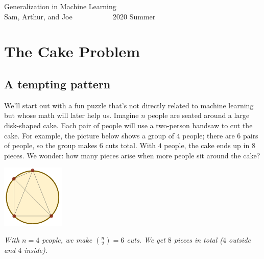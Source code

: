 \documentclass[openany, notitlepage, justified]{tufte-book}
\begin{document}
    \begin{adjustwidth}{0in}{-1.3in}
    \begin{center}
        \Huge 
        Generalization in Machine Learning \\
        \large         
        Sam, Arthur, and Joe ~~~~~~~~~~ 2020 Summer
    \end{center}
    \end{adjustwidth}

    \chapter{The Cake Problem}
        \section{A tempting pattern}
            We'll start out with a fun puzzle that's not directly related to
            machine learning but whose math will later help us.
            Imagine $n$ people are seated around a large disk-shaped cake.
            Each pair of people will use a two-person handsaw to cut the cake.
            For example, the picture below shows a group of $4$ people; there
            are $6$ pairs of people, so the group makes $6$ cuts total.  With
            $4$ people, the cake ends up in $8$ pieces.  We
            wonder: how many pieces arise when more people sit
            around the cake?
            \begin{marginfigure}
                \centering
                \includegraphics[height=3cm]{cake-4}
                \caption{\emph{
                    With $n=4$ people, we make ${n\choose 2}=6$ cuts.  We get
                    $8$ pieces in total ($4$ outside and $4$ inside).  
                }}
            \end{marginfigure}
\end{document}
